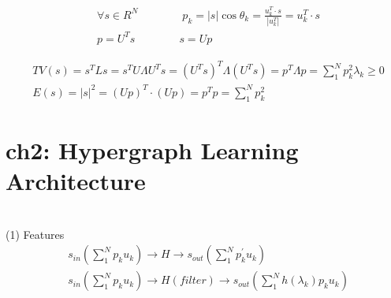 \documentclass{article}
\begin{document}
%
\begin{align*}
    & \forall s \in R^{N} \qquad \qquad 
      p_{k} = |s| \cos \theta_{k} = 
      \frac{u_{k}^{T} \cdot s}{|u_{k}^{T}|} = 
      u_{k}^{T} \cdot s  \\[3pt]
    & p = U^{T} s \qquad \qquad s = U p 
\end{align*}

%
\begin{align*}
    & TV(s) = s^{T} L s = s^{T} U \Lambda U^{T} s = 
      ( U^{T} s )^{T} \Lambda ( U^{T} s ) = 
      p^{T} \Lambda p = \sum_{1}^{N} 
      p_{k}^{2} \lambda_{k} \ge 0  \\[3pt]
    & E(s) = |s|^{2} = ( U p )^{T} \cdot ( U p ) = 
      p^{T} p = \sum_{1}^{N} p_{k}^{2} 
\end{align*}

\newpage
\section*{ch2: Hypergraph Learning Architecture}


~ \\[3pt]
(1) Features
\begin{align*}
    & s_{in} \left ( \sum_{1}^{N} p_{k} {u_{k}} \right )
      \to H \to 
      s_{out} \left ( \sum_{1}^{N} p_{k}^{'} {u_{k}} \right )  \\[3pt]
    & s_{in} \left ( \sum_{1}^{N} p_{k} {u_{k}} \right )
      \to H(filter) \to 
      s_{out} \left ( \sum_{1}^{N} h(\lambda_{k}) p_{k} u_{k} \right )  \\[3pt]
\end{align*}
\end{document}
